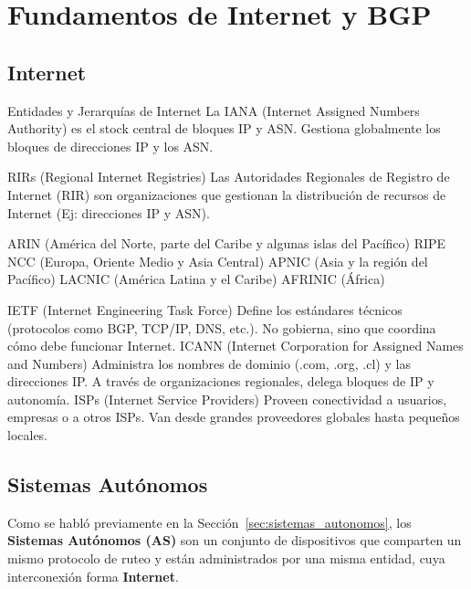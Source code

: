 \section{Fundamentos de Internet y BGP} \label{sec:anexo_fundamentos_internet_bgp}

\subsection{Internet} \label{sec:anexo_internet}
Entidades y Jerarquías de Internet
La IANA (Internet Assigned Numbers Authority) es el stock central de bloques IP y ASN. Gestiona globalmente los bloques de direcciones IP y los ASN.

RIRs (Regional Internet Registries)
Las Autoridades Regionales de Registro de Internet (RIR) son organizaciones que gestionan la distribución de recursos de Internet (Ej: direcciones IP y ASN).

ARIN (América del Norte, parte del Caribe y algunas islas del Pacífico)
RIPE NCC (Europa, Oriente Medio y Asia Central)
APNIC (Asia y la región del Pacífico)
LACNIC (América Latina y el Caribe)
AFRINIC (África)

IETF (Internet Engineering Task Force)
Define los estándares técnicos (protocolos como BGP, TCP/IP, DNS, etc.).
No gobierna, sino que coordina cómo debe funcionar Internet.
ICANN (Internet Corporation for Assigned Names and Numbers)
Administra los nombres de dominio (.com, .org, .cl) y las direcciones IP.
A través de organizaciones regionales, delega bloques de IP y autonomía.
ISPs (Internet Service Providers)
Proveen conectividad a usuarios, empresas o a otros ISPs.
Van desde grandes proveedores globales hasta pequeños locales.


























\subsection{Sistemas Autónomos} \label{sec:anexo_sistemas_autonomos}


Como se habló previamente en la Sección~\ref{sec:sistemas_autonomos}, los \textbf{Sistemas Autónomos (AS)} son un conjunto de dispositivos que comparten un mismo protocolo de ruteo y están administrados por una misma entidad, cuya interconexión forma \textbf{Internet}.\\


